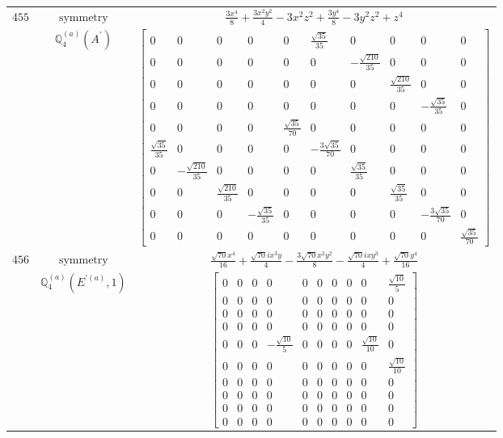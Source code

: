 \documentclass[fleqn,8pt,landscape]{jsarticle}
\begin{document}
\begin{longtable}{ccc}
$ 455 $ & $ \text{symmetry} $ & $ \frac{3 x^{4}}{8} + \frac{3 x^{2} y^{2}}{4} - 3 x^{2} z^{2} + \frac{3 y^{4}}{8} - 3 y^{2} z^{2} + z^{4} $ \\
$  $ & $ \mathbb{Q}_{4}^{(a)}(A^{\prime}) $ & $ \begin{bmatrix} 0 & 0 & 0 & 0 & 0 & \frac{\sqrt{35}}{35} & 0 & 0 & 0 & 0 \\ 0 & 0 & 0 & 0 & 0 & 0 & - \frac{\sqrt{210}}{35} & 0 & 0 & 0 \\ 0 & 0 & 0 & 0 & 0 & 0 & 0 & \frac{\sqrt{210}}{35} & 0 & 0 \\ 0 & 0 & 0 & 0 & 0 & 0 & 0 & 0 & - \frac{\sqrt{35}}{35} & 0 \\ 0 & 0 & 0 & 0 & \frac{\sqrt{35}}{70} & 0 & 0 & 0 & 0 & 0 \\ \frac{\sqrt{35}}{35} & 0 & 0 & 0 & 0 & - \frac{3 \sqrt{35}}{70} & 0 & 0 & 0 & 0 \\ 0 & - \frac{\sqrt{210}}{35} & 0 & 0 & 0 & 0 & \frac{\sqrt{35}}{35} & 0 & 0 & 0 \\ 0 & 0 & \frac{\sqrt{210}}{35} & 0 & 0 & 0 & 0 & \frac{\sqrt{35}}{35} & 0 & 0 \\ 0 & 0 & 0 & - \frac{\sqrt{35}}{35} & 0 & 0 & 0 & 0 & - \frac{3 \sqrt{35}}{70} & 0 \\ 0 & 0 & 0 & 0 & 0 & 0 & 0 & 0 & 0 & \frac{\sqrt{35}}{70} \end{bmatrix} $ \\ \hline
$ 456 $ & $ \text{symmetry} $ & $ \frac{\sqrt{70} x^{4}}{16} + \frac{\sqrt{70} i x^{3} y}{4} - \frac{3 \sqrt{70} x^{2} y^{2}}{8} - \frac{\sqrt{70} i x y^{3}}{4} + \frac{\sqrt{70} y^{4}}{16} $ \\
$  $ & $ \mathbb{Q}_{4}^{(a)}(E^{\prime(a)},1) $ & $ \begin{bmatrix} 0 & 0 & 0 & 0 & 0 & 0 & 0 & 0 & 0 & \frac{\sqrt{10}}{5} \\ 0 & 0 & 0 & 0 & 0 & 0 & 0 & 0 & 0 & 0 \\ 0 & 0 & 0 & 0 & 0 & 0 & 0 & 0 & 0 & 0 \\ 0 & 0 & 0 & 0 & 0 & 0 & 0 & 0 & 0 & 0 \\ 0 & 0 & 0 & - \frac{\sqrt{10}}{5} & 0 & 0 & 0 & 0 & \frac{\sqrt{10}}{10} & 0 \\ 0 & 0 & 0 & 0 & 0 & 0 & 0 & 0 & 0 & \frac{\sqrt{10}}{10} \\ 0 & 0 & 0 & 0 & 0 & 0 & 0 & 0 & 0 & 0 \\ 0 & 0 & 0 & 0 & 0 & 0 & 0 & 0 & 0 & 0 \\ 0 & 0 & 0 & 0 & 0 & 0 & 0 & 0 & 0 & 0 \\ 0 & 0 & 0 & 0 & 0 & 0 & 0 & 0 & 0 & 0 \end{bmatrix} $ \\ \hline

\end{longtable}
\end{document}
